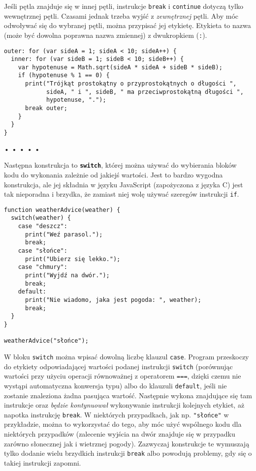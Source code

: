   
Jeśli pętla znajduje się w innej pętli, instrukcje \texttt{break} i \texttt{continue} dotyczą tylko wewnętrznej pętli. Czasami jednak trzeba wyjść z \emph{zewnętrznej} pętli. Aby móc odwoływać się do wybranej pętli, można przypisać jej etykietę. Etykieta to nazwa (może być dowolna poprawna nazwa zmiennej) z dwukropkiem (\texttt{:}).

\begin{verbatim} 
outer: for (var sideA = 1; sideA < 10; sideA++) {
  inner: for (var sideB = 1; sideB < 10; sideB++) {
    var hypotenuse = Math.sqrt(sideA * sideA + sideB * sideB);
    if (hypotenuse % 1 == 0) {
      print("Trójkąt prostokątny o przyprostokątnych o długości ",
            sideA, " i ", sideB, " ma przeciwprostokątną długości ",
            hypotenuse, ".");
      break outer;
    }
  }
}
\end{verbatim}

\begin{center} 
 • • • • • 
\end{center}

  
Następna konstrukcja to \textbf{\texttt{switch}}, której można używać do wybierania bloków kodu do wykonania zależnie od jakiejś wartości. Jest to bardzo wygodna konstrukcja, ale jej składnia w języku JavaScript (zapożyczona z języka C) jest tak nieporadna i brzydka, że zamiast niej wolę używać szeregów instrukcji \texttt{if}.

\begin{verbatim} 
function weatherAdvice(weather) {
  switch(weather) {
    case "deszcz":
      print("Weź parasol.");
      break;
    case "słońce":
      print("Ubierz się lekko.");
    case "chmury":
      print("Wyjdź na dwór.");
      break;
    default:
      print("Nie wiadomo, jaka jest pogoda: ", weather);
      break;
  }
}

weatherAdvice("słońce");
\end{verbatim}
  
W bloku \texttt{switch} można wpisać dowolną liczbę klauzul \texttt{case}. Program przeskoczy do etykiety odpowiadającej wartości podanej instrukcji \texttt{switch} (porównując wartości przy użyciu operacji równoważnej z operatorem \texttt{===}, dzięki czemu nie wystąpi automatyczna konwersja typu) albo do klauzuli \texttt{default}, jeśli nie zostanie znaleziona żadna pasująca wartość. Następnie wykona znajdujące się tam instrukcje oraz \emph{będzie kontynuował} wykonywanie instrukcji kolejnych etykiet, aż napotka instrukcję \texttt{break}. W niektórych przypadkach, jak np. \texttt{"słońce"} w przykładzie, można to wykorzystać do tego, aby móc użyć wspólnego kodu dla niektórych przypadków (zalecenie wyjścia na dwór znajduje się w przypadku zarówno słonecznej jak i wietrznej pogody). Zazwyczaj konstrukcje te wymuszają tylko dodanie wielu brzydkich instrukcji \texttt{break} albo powodują problemy, gdy się o takiej instrukcji zapomni.

